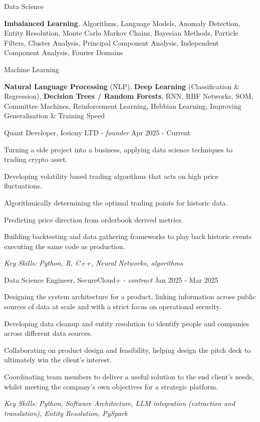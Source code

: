 \documentclass[11pt,article,oneside]{memoir}
\newenvironment{itemize*}{%
  \renewcommand\labelitemi{\textbullet}
  \footnotesize
  \begin{itemize}%
    \setlength{\itemsep}{0pt}}%
  {\end{itemize}
}
\begin{document}
\ind Data Science

\ind \hspace{0.354in} \footnotesize \textbf{Imbalanced Learning}, Algorithms, Language Models, Anomaly Detection, Entity Resolution, 
    Monte Carlo Markov Chains, Bayesian Methods, Particle Filters, 
    Cluster Analysis, Principal Component Analysis, Independent Component Analysis, Fourier Domains \normalsize

\ind Machine Learning 

\ind \hspace{0.354in} \footnotesize \textbf{Natural Language Processing} (NLP), \textbf{Deep Learning} (Classification \& Regression), \textbf{Decision Trees / Random Forests},
    RNN, RBF Networks, SOM, Committee Machines, Reinforcement Learning, Hebbian Learning, Improving Generalisation \& Training Speed \normalsize

\bigskip
 

\normalsize
\medskip
\ind Quant Developer, Iceiony LTD - \emph{founder} \hfill Apr 2025 - Current
\begin{itemize*}
  \item Turning a side project into a business, applying data science techniques to trading crypto asset.
  \item Developing volatility based trading algorithms that acts on high price fluctuations.
  \item Algorithmically determining the optimal trading points for historic data. 
  \item Predicting price direction from orderbook derived metrics.
  \item Building backtesting and data gathering frameworks to play back historic events executing the same code as production.
\end{itemize*}
\ind \hspace{0.35in} \footnotesize \emph{Key Skills: Python, R, C++, Neural Networks, algorithms }

\normalsize
\medskip
\ind Data Science Engineer, SecureCloud+ - \emph{contract} \hfill Jan 2025 - Mar 2025
\begin{itemize*}
    \item Designing the system architecture for a product, linking information across public sources of data at scale and with a strict focus on operational security.
    \item Developing data cleanup and entity resolution to identify people and companies across different data sources.
    \item Collaborating on product design and feasibility, helping design the pitch deck to ultimately win the client's interest.
    \item Coordinating team members to deliver a useful solution to the end client's needs, whilst meeting the company's own objectives for a strategic platform. 
\end{itemize*}
\ind \hspace{0.35in} \footnotesize \emph{Key Skills: Python, Software Architecture, LLM integration (extraction and translation), Entity Resolution, PySpark}
\end{document}
